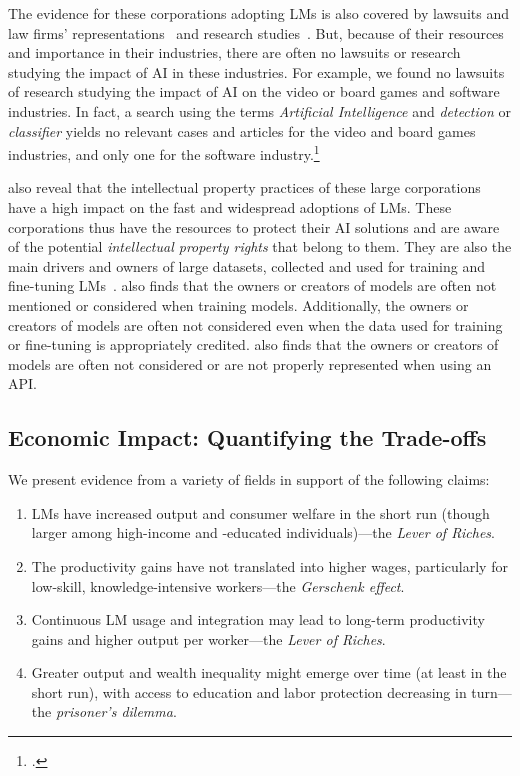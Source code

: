 {{{{The evidence for these corporations adopting LMs is also covered by lawsuits and law firms' representations~\citep{gry2024ai, mishcon_generative_ai_ip_tracker, gry2024ai, he2024ai, restrepo2024society, deitrich2024book} and research studies~\citep{gry2024ai, mishcon_generative_ai_ip_tracker, gry2024ai, he2024ai, restrepo2024society, deitrich2024book}.
But, because of their resources and importance in their industries, there are often no lawsuits or research studying the impact of AI in these industries.
For example, we found no lawsuits of research studying the impact of AI on the video or board games and software industries.
In fact, a search using the terms \emph{Artificial Intelligence} and \emph{detection} or \emph{classifier} yields no relevant cases and articles for the video and board games industries, and only one for the software industry.\footnote{\citet{fowler2023falsepositives}.}

\citet{gry2024ai, mishcon_generative_ai_ip_tracker, gry2024ai, he2024ai, restrepo2024society, deitrich2024book} also reveal that the intellectual property practices of these large corporations have a high impact on the fast and widespread adoptions of LMs.
These corporations thus have the resources to protect their AI solutions and are aware of the potential \emph{intellectual property rights} that belong to them.
They are also the main drivers and owners of large datasets, collected and used for training and fine-tuning LMs~\citep{longpre2024large}.
\citet{gry2024ai} also finds that the owners or creators of models are often not mentioned or considered when training models.
Additionally, the owners or creators of models are often not considered even when the data used for training or fine-tuning is appropriately credited.
\citet{gry2024ai} also finds that the owners or creators of models are often not considered or are not properly represented when using an API.

\subsection{Economic Impact: Quantifying the Trade-offs}
\label{EconEvidence}

We present evidence from a variety of fields in support of the following claims:
\begin{enumerate}[wide,labelindent=0pt, topsep=0pt, itemsep=1pt]
    \item LMs have increased output and consumer welfare in the short run (though larger among high-income and -educated individuals)---the \emph{Lever of Riches}.
    \item The productivity gains have not translated into higher wages, particularly for low-skill, knowledge-intensive workers---the \emph{Gerschenk effect}.
    \item Continuous LM usage and integration may lead to long-term productivity gains and higher output per worker---the \emph{Lever of Riches}.
    \item Greater output and wealth inequality might emerge over time (at least in the short run), with access to education and labor protection decreasing in turn---the \emph{prisoner's dilemma}.
\end{enumerate}

}}}}
